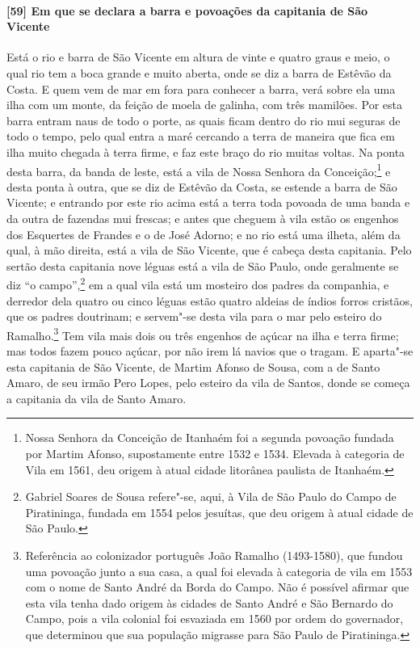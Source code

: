\begin{linenumbers}
\paragraph{[59] Em que se declara a barra e povoações da capitania de São Vicente} \quad
Está o rio e barra de São Vicente em altura de vinte e quatro graus e meio, o qual rio tem
a boca grande e muito aberta, onde se diz a barra de Estêvão da Costa. E quem vem de mar
em fora para conhecer a barra, verá sobre ela uma ilha com um monte, da feição de moela de
galinha, com três mamilões. Por esta barra entram naus de todo o porte, as quais ficam
dentro do rio mui seguras de todo o tempo, pelo qual entra a maré cercando a terra de
maneira que fica em ilha muito chegada à terra firme, e faz este braço do rio muitas
voltas. Na ponta desta barra, da banda de leste, está a vila de Nossa Senhora da
Conceição;\footnote{ Nossa Senhora da Conceição de Itanhaém foi a segunda povoação fundada
por Martim Afonso, supostamente entre 1532 e 1534. Elevada à categoria de Vila em 1561,
deu origem à atual cidade litorânea paulista de Itanhaém.} e desta ponta à outra, que se
diz de Estêvão da Costa, se estende a barra de São Vicente; e entrando por este rio acima
está a terra toda povoada de uma banda e da outra de fazendas mui frescas; e antes que
cheguem à vila estão os engenhos dos Esquertes de Frandes e o de José Adorno; e no rio
está uma ilheta, além da qual, à mão direita, está a vila de São Vicente, que é cabeça
desta capitania. Pelo sertão desta capitania nove léguas está a vila de São Paulo, onde
geralmente se diz ``o campo'',\footnote{ Gabriel Soares de Sousa refere"-se, aqui, à Vila de
São Paulo do Campo de Piratininga, fundada em 1554 pelos jesuítas, que deu origem à atual
cidade de São Paulo.} em a qual vila está um mosteiro dos padres da companhia, e derredor
dela quatro ou cinco léguas estão quatro aldeias de índios forros cristãos, que os padres
doutrinam; e servem"-se desta vila para o mar pelo esteiro do Ramalho.\footnote{ Referência
ao colonizador português João Ramalho (1493-1580), que fundou uma povoação junto a sua
casa, a qual foi elevada à categoria de vila em 1553 com o nome de Santo André da Borda do
Campo. Não é possível afirmar que esta vila tenha dado origem às cidades de Santo André e
São Bernardo do Campo, pois a vila colonial foi esvaziada em 1560 por ordem do
governador, que determinou que sua população migrasse para São Paulo de Piratininga.}
Tem vila mais dois ou três engenhos de açúcar na ilha e terra firme; mas todos fazem pouco
açúcar, por não irem lá navios que o tragam. E aparta"-se esta capitania de São Vicente, de
Martim Afonso de Sousa, com a de Santo Amaro, de seu irmão Pero Lopes, pelo esteiro da
vila de Santos, donde se começa a capitania da vila de Santo Amaro.


\end{linenumbers}
